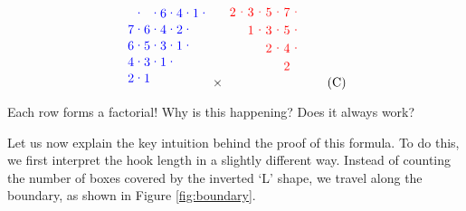 \documentclass[a4paper,11pt]{amsart}
\begin{document}
\begin{equation}
\begin{tikzpicture}[blue,yscale=-0.45, xscale=0.45]
				\node at (2.5,0.5) {6};
				\node at (3.5,0.5) {4};
				\node at (4.5,0.5) {1};
				\node at (0.5,1.5) {7};
				\node at (1.5,1.5) {6};
				\node at (2.5,1.5) {4};
				\node at (3.5,1.5) {2};
				\node at (0.5,2.5) {6};
				\node at (1.5,2.5) {5};
				\node at (2.5,2.5) {3};
				\node at (3.5,2.5) {1};
				\node at (0.5,3.5) {4};
				\node at (1.5,3.5) {3};
				\node at (2.5,3.5) {1};
				\node at (0.5,4.5) {2};
				\node at (1.5,4.5) {1};
				\node at (1,0.5) {$\cdot$};
				\node at (2,0.5) {$\cdot$};
				\node at (3,0.5) {$\cdot$};
				\node at (4,0.5) {$\cdot$};
				\node at (5,0.5) {$\cdot$};
				\node at (1,1.5) {$\cdot$};
				\node at (2,1.5) {$\cdot$};
				\node at (3,1.5) {$\cdot$};
				\node at (4,1.5) {$\cdot$};
				\node at (1,2.5) {$\cdot$};
				\node at (2,2.5) {$\cdot$};
				\node at (3,2.5) {$\cdot$};
				\node at (4,2.5) {$\cdot$};
				\node at (1,3.5) {$\cdot$};
				\node at (2,3.5) {$\cdot$};
				\node at (3,3.5) {$\cdot$};
				\node at (1,4.5) {$\cdot$};
			\end{tikzpicture}\times
			\begin{tikzpicture}[red, xscale = 0.5, yscale=-0.5]
				\draw (0.5,0.5)  node{$2$};
				\draw (1.5,0.5)  node{$3$};
				\draw (2.5,0.5)  node{$5$};
				\draw (3.5,0.5)  node{$7$};
				\draw (1.5,1.5)  node{$1$};
				\draw (2.5,1.5)  node{$3$};
				\draw (3.5,1.5)  node{$5$};
				\draw (2.5,2.5)  node{$2$};
				\draw (3.5,2.5)  node{$4$};
				\draw (3.5,3.5)  node{$2$};
				\filldraw [opacity=0] (3,4) rectangle (3.3,4.6);
				\node at (1,0.5) {$\cdot$};
				\node at (2,0.5) {$\cdot$};
				\node at (3,0.5) {$\cdot$};
				\node at (4,0.5) {$\cdot$};
				\node at (2,1.5) {$\cdot$};
				\node at (3,1.5) {$\cdot$};
				\node at (4,1.5) {$\cdot$};
				\node at (3,2.5) {$\cdot$};
				\node at (4,2.5) {$\cdot$};
			\end{tikzpicture}\label{cross-multiply}
			\tag{C}
			\end{equation} 

Each row forms a factorial! Why is this happening? Does it always work?

Let us now explain the key intuition behind the proof of this formula. To do this, we first interpret the hook length in a slightly different way. Instead of counting the number of boxes covered by the inverted `L' shape, we travel along the boundary, as shown in Figure \ref{fig:boundary}.
\end{document}
